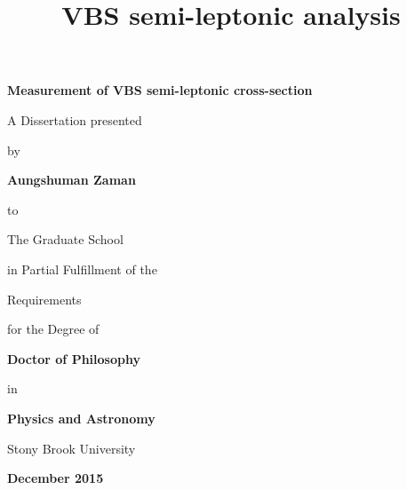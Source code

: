 \documentclass[12pt]{article}
\begin{document}
\title{\bf{VBS semi-leptonic analysis}}

\vspace*{3\baselineskip}
\centerline{\bf{Measurement of VBS semi-leptonic cross-section}}
\vspace*{1\baselineskip}
\centerline{A Dissertation presented}
\vspace*{1\baselineskip}
\centerline{by} 
\vspace*{1\baselineskip}
\centerline{\bf{Aungshuman Zaman}}
\vspace*{1\baselineskip}
\centerline{to} 
\vspace*{1\baselineskip}
\centerline{The Graduate School}
\vspace*{1\baselineskip}
\centerline{in Partial Fulfillment of the}
\vspace*{1\baselineskip}
\centerline{Requirements}
\vspace*{1\baselineskip}
\centerline{for the Degree of}
\vspace*{1\baselineskip}
\centerline{\bf{Doctor of Philosophy}}
\vspace*{1\baselineskip}
\centerline{in}
\vspace*{1\baselineskip}
\centerline{\bf{Physics and Astronomy}}
\vspace*{1\baselineskip}
\vspace*{2\baselineskip}
\centerline{Stony Brook University}
\vspace*{2\baselineskip}
\centerline{\bf{December 2015}}     

\newpage
{}


\newpage
{}
\setcounter{page}{2}
\end{document}
